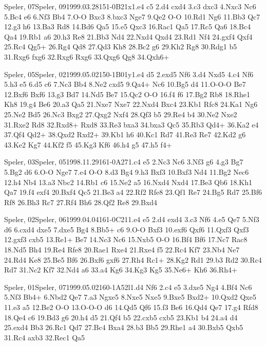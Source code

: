 \documentclass[twocolumn,a4paper,10pt]{report}
\begin{document}
\begin{chessgame}{Speler, 07}{Speler, 09}{1999.03.28}{15}{1-0}{B21x}{1.e4 c5 2.d4 cxd4 3.c3 dxc3 4.Nxc3 Nc6 5.Bc4 e6 6.Nf3 Bb4 7.O-O Bxc3 8.bxc3 Nge7 9.Qe2 O-O 10.Rd1 Ng6 11.Bb3 Qc7 12.g3 h6 13.Ba3 Rd8 14.Bd6 Qa5 15.e5 Qxc3 16.Rac1 Qa5 17.Rc5 Qa6 18.Bc4 Qa4 19.Rb1 a6 20.h3 Re8 21.Bb3 Nd4 22.Nxd4 Qxd4 23.Rd1 Nf4 24.gxf4 Qxf4 25.Rc4 Qg5+ 26.Rg4 Qd8 27.Qd3 Kh8 28.Bc2 g6 29.Kh2 Rg8 30.Rdg1 b5 31.Rxg6 fxg6 32.Rxg6 Rxg6 33.Qxg6 Qg8 34.Qxh6+}\end{chessgame}
\begin{chessgame}{Speler, 05}{Speler, 02}{1999.05.02}{15}{0-1}{B01y}{1.e4 d5 2.exd5 Nf6 3.d4 Nxd5 4.c4 Nf6 5.h3 e5 6.d5 c6 7.Nc3 Bb4 8.Ne2 cxd5 9.Qa4+ Nc6 10.Bg5 d4 11.O-O-O Be7 12.Bxf6 Bxf6 13.g3 Bd7 14.Nd5 Be7 15.Qc2 O-O 16.f4 f6 17.Bg2 Rb8 18.Rhe1 Kh8 19.g4 Be6 20.a3 Qa5 21.Nxe7 Nxe7 22.Nxd4 Bxc4 23.Kb1 Rfc8 24.Ka1 Ng6 25.Ne2 Bd5 26.Nc3 Bxg2 27.Qxg2 Nxf4 28.Qf3 b5 29.Re4 b4 30.Ne2 Nxe2 31.Rxe2 Rd8 32.Rxd8+ Rxd8 33.Re3 bxa3 34.bxa3 Qc5 35.Rb3 Qd4+ 36.Ka2 e4 37.Qf4 Qd2+ 38.Qxd2 Rxd2+ 39.Kb1 h6 40.Kc1 Rd7 41.Re3 Re7 42.Kd2 g6 43.Ke2 Kg7 44.Kf2 f5 45.Kg3 Kf6 46.h4 g5 47.h5 f4+}\end{chessgame}
\begin{chessgame}{Speler, 03}{Speler, 05}{1998.11.29}{16}{1-0}{A27}{1.c4 e5 2.Nc3 Nc6 3.Nf3 g6 4.g3 Bg7 5.Bg2 d6 6.O-O Nge7 7.e4 O-O 8.d3 Bg4 9.h3 Bxf3 10.Bxf3 Nd4 11.Bg2 Nec6 12.h4 Nb4 13.a3 Nbc2 14.Rb1 c6 15.Ne2 a5 16.Nxd4 Nxd4 17.Be3 Qb6 18.Kh1 Qa7 19.f4 exf4 20.Bxf4 Qc5 21.Be3 a4 22.Rf2 Rfe8 23.Qf1 Re7 24.Bg5 Rd7 25.Bf6 Rf8 26.Bh3 Rc7 27.Rf4 Bh6 28.Qf2 Re8 29.Bxd4}\end{chessgame}
\begin{chessgame}{Speler, 02}{Speler, 06}{1999.04.04}{16}{1-0}{C21}{1.e4 e5 2.d4 exd4 3.c3 Nf6 4.e5 Qe7 5.Nf3 d6 6.cxd4 dxe5 7.dxe5 Bg4 8.Bb5+ c6 9.O-O Bxf3 10.exf6 Qxf6 11.Qxf3 Qxf3 12.gxf3 cxb5 13.Re1+ Be7 14.Nc3 Nc6 15.Nxb5 O-O 16.Bf4 Bf6 17.Nc7 Rac8 18.Nd5 Bh4 19.Re4 Rfe8 20.Rae1 Rxe4 21.Rxe4 f5 22.Rc4 Kf7 23.Nb4 Ne7 24.Rd4 Ke8 25.Be5 Bf6 26.Bxf6 gxf6 27.Rh4 Rc1+ 28.Kg2 Rd1 29.b3 Rd2 30.Rc4 Rd7 31.Nc2 Kf7 32.Nd4 a6 33.a4 Kg6 34.Kg3 Kg5 35.Ne6+ Kh6 36.Rh4+}\end{chessgame}
\begin{chessgame}{Speler, 01}{Speler, 07}{1999.05.02}{16}{0-1}{A52l}{1.d4 Nf6 2.c4 e5 3.dxe5 Ng4 4.Bf4 Nc6 5.Nf3 Bb4+ 6.Nbd2 Qe7 7.a3 Ngxe5 8.Nxe5 Nxe5 9.Bxe5 Bxd2+ 10.Qxd2 Qxe5 11.e3 a5 12.Be2 O-O 13.O-O-O d6 14.Qd5 Qf6 15.f3 Be6 16.Qd4 Qe7 17.g4 Rfd8 18.Qe4 c6 19.Bd3 g6 20.h4 d5 21.Qf4 b5 22.cxb5 cxb5 23.Kb1 b4 24.a4 d4 25.exd4 Bb3 26.Rc1 Qd7 27.Bc4 Bxa4 28.b3 Bb5 29.Rhe1 a4 30.Bxb5 Qxb5 31.Rc4 axb3 32.Rec1 Qa5}\end{chessgame}
\end{document}
